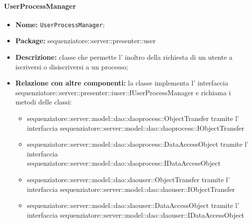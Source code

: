 \paragraph{UserProcessManager}
	\begin{itemize}
		\item \textbf{Nome:} \texttt{UserProcessManager};
		\item \textbf{Package:} sequenziatore::server::presenter::user
		\item \textbf{Descrizione:} classe che permette l' inoltro della richiesta di un utente a iscriversi o disiscriversi a un processo;
		\item \textbf{Relazione con altre componenti:} la classe implementa l' interfaccia sequenziatore::server::presenter::iuser::IUserProcessManager e richiama i metodi delle classi:
		\begin{itemize}
			\item sequenziatore::server::model::dao::daoprocess::ObjectTransfer tramite l' interfaccia sequenziatore::server::model::dao::daoprocess::IObjectTransfer
			\item sequenziatore::server::model::dao::daoprocess::DataAccessObject tramite l' interfaccia sequenziatore::server::model::dao::daoprocess::IDataAccessObject
			\item sequenziatore::server::model::dao::daouser::ObjectTransfer tramite l' interfaccia sequenziatore::server::model::dao::daouser::IObjectTransfer
			\item sequenziatore::server::model::dao::daouser::DataAccessObject tramite l' interfaccia sequenziatore::server::model::dao::daouser::IDataAccessObject
		\end{itemize}
	\end{itemize}
